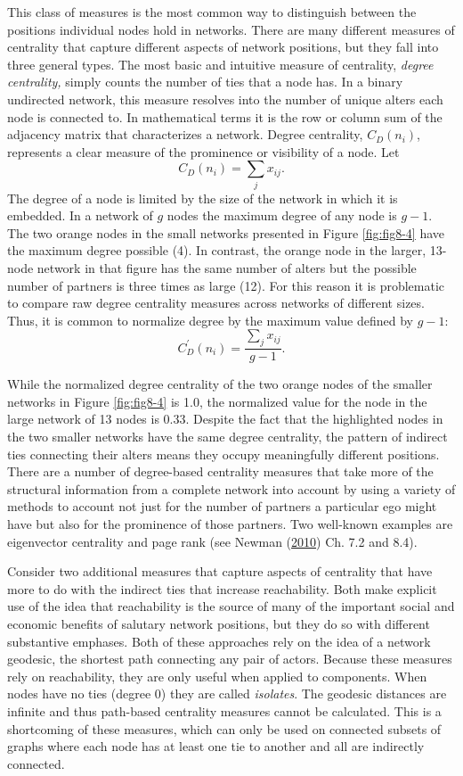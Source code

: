 \documentclass[]{krantz}
\begin{document}
This class of measures is the most common way to distinguish between the
positions individual nodes hold in networks. There are many different
measures of centrality that capture different aspects of network
positions, but they fall into three general types. The most basic and
intuitive measure of centrality, \emph{degree centrality,} simply counts
the number of ties that a node has. In a binary undirected network, this
measure resolves into the number of unique alters each node is connected
to. In mathematical terms it is the row or column sum of the adjacency
matrix that characterizes a network. Degree centrality,
\(C_{D}(n_{i})\), represents a clear measure of the prominence or
visibility of a node. Let \[C_D(n_i)=\sum_jx_{ij}.\] The degree of a
node is limited by the size of the network in which it is embedded. In a
network of \(g\) nodes the maximum degree of any node is \(g-1\). The
two orange nodes in the small networks presented in Figure
\ref{fig:fig8-4} have the maximum degree possible (4). In contrast, the
orange node in the larger, 13-node network in that figure has the same
number of alters but the possible number of partners is three times as
large (12). For this reason it is problematic to compare raw degree
centrality measures across networks of different sizes. Thus, it is
common to normalize degree by the maximum value defined by \(g-1\):
\[C_D^{\prime}(n_i)=\frac{\sum_j x_{ij}}{g-1}.\]

While the normalized degree centrality of the two orange nodes of the
smaller networks in Figure \ref{fig:fig8-4} is 1.0, the normalized value
for the node in the large network of 13 nodes is 0.33. Despite the fact
that the highlighted nodes in the two smaller networks have the same
degree centrality, the pattern of indirect ties connecting their alters
means they occupy meaningfully different positions. There are a number
of degree-based centrality measures that take more of the structural
information from a complete network into account by using a variety of
methods to account not just for the number of partners a particular ego
might have but also for the prominence of those partners. Two well-known
examples are eigenvector centrality and page rank (see Newman
(\protect\hyperlink{ref-newman2010networks}{2010}) Ch. 7.2 and 8.4).

Consider two additional measures that capture aspects of centrality that
have more to do with the indirect ties that increase reachability. Both
make explicit use of the idea that reachability is the source of many of
the important social and economic benefits of salutary network
positions, but they do so with different substantive emphases. Both of
these approaches rely on the idea of a network geodesic, the shortest
path connecting any pair of actors. Because these measures rely on
reachability, they are only useful when applied to components. When
nodes have no ties (degree 0) they are called \emph{isolates}. The
geodesic distances are infinite and thus path-based centrality measures
cannot be calculated. This is a shortcoming of these measures, which can
only be used on connected subsets of graphs where each node has at least
one tie to another and all are indirectly connected.
\end{document}
